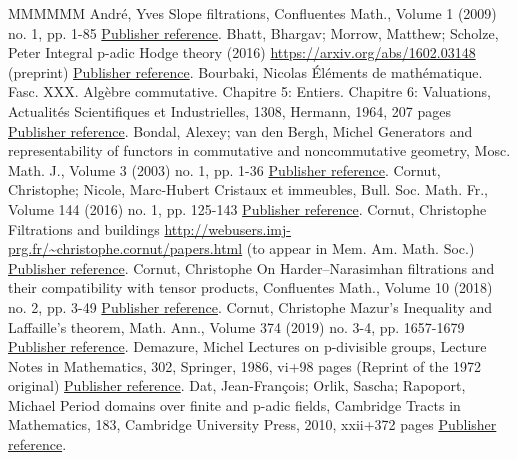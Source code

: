 \begin{thebibliography}{MMMMMM}
 André, Yves Slope filtrations, Confluentes Math., Volume 1 (2009) no. 1, pp. 1-85 \href{https://ahl.centre-mersenne.org/item/AHL_2019__2__415_0/#An09}{Publisher reference}.
 Bhatt, Bhargav; Morrow, Matthew; Scholze, Peter Integral p-adic Hodge theory (2016) \url{https://arxiv.org/abs/1602.03148} (preprint) \href{https://ahl.centre-mersenne.org/item/AHL_2019__2__415_0/#BaMoSc16}{Publisher reference}.
 Bourbaki, Nicolas Éléments de mathématique. Fasc. XXX. Algèbre commutative. Chapitre 5: Entiers. Chapitre 6: Valuations, Actualités Scientifiques et Industrielles, 1308, Hermann, 1964, 207 pages \href{https://ahl.centre-mersenne.org/item/AHL_2019__2__415_0/#BoAC56}{Publisher reference}.
 Bondal, Alexey; van den Bergh, Michel Generators and representability of functors in commutative and noncommutative geometry, Mosc. Math. J., Volume 3 (2003) no. 1, pp. 1-36 \href{https://ahl.centre-mersenne.org/item/AHL_2019__2__415_0/#BoVdB03}{Publisher reference}.
 Cornut, Christophe; Nicole, Marc-Hubert Cristaux et immeubles, Bull. Soc. Math. Fr., Volume 144 (2016) no. 1, pp. 125-143 \href{https://ahl.centre-mersenne.org/item/AHL_2019__2__415_0/#CoNi16}{Publisher reference}.
 Cornut, Christophe Filtrations and buildings \url{http://webusers.imj-prg.fr/~christophe.cornut/papers.html} (to appear in Mem. Am. Math. Soc.) \href{https://ahl.centre-mersenne.org/item/AHL_2019__2__415_0/#Co14}{Publisher reference}.
 Cornut, Christophe On Harder–Narasimhan filtrations and their compatibility with tensor products, Confluentes Math., Volume 10 (2018) no. 2, pp. 3-49 \href{https://ahl.centre-mersenne.org/item/AHL_2019__2__415_0/#Co16}{Publisher reference}.
 Cornut, Christophe Mazur’s Inequality and Laffaille’s theorem, Math. Ann., Volume 374 (2019) no. 3-4, pp. 1657-1679 \href{https://ahl.centre-mersenne.org/item/AHL_2019__2__415_0/#Co15}{Publisher reference}.
 Demazure, Michel Lectures on p-divisible groups, Lecture Notes in Mathematics, 302, Springer, 1986, vi+98 pages (Reprint of the 1972 original) \href{https://ahl.centre-mersenne.org/item/AHL_2019__2__415_0/#De86}{Publisher reference}.
 Dat, Jean-François; Orlik, Sascha; Rapoport, Michael Period domains over finite and p-adic fields, Cambridge Tracts in Mathematics, 183, Cambridge University Press, 2010, xxii+372 pages \href{https://ahl.centre-mersenne.org/item/AHL_2019__2__415_0/#DaOrRa10}{Publisher reference}.

\end{thebibliography}
